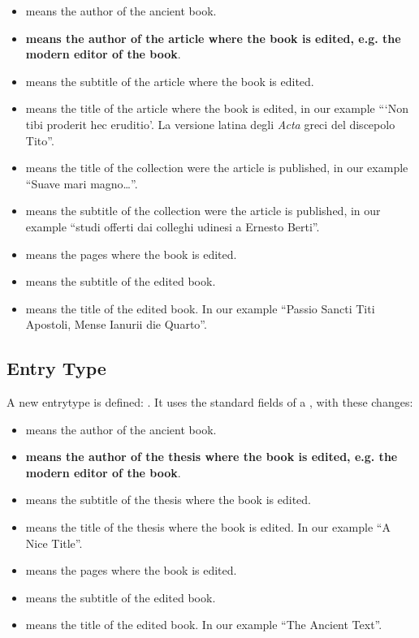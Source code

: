 \documentclass{ltxdockit}[2011/03/25]
\begin{document}
\begin{itemize}
	\item {} means the author of the ancient book.
	\item \textbf{ means the author of the article where the book is edited, e.g. the modern editor of the book}.
	\item {} means the subtitle of the article where the book is edited.
	\item {} means the title of the article where the book is edited, in our example \enquote{\enquote{Non tibi proderit hec eruditio}. La versione latina degli \emph{Acta} greci del discepolo Tito}. 
	\item {} means the title of the collection were the article is published, in our example \enquote{Suave mari magno\ldots}.
	\item {} means the subtitle of the collection were the article is published, in our example \enquote{studi offerti dai colleghi udinesi a Ernesto Berti}.
	\item {} means the pages where the book is edited.
	\item {} means the subtitle of the edited book.
	\item {} means the title of the edited book. In our example \enquote{Passio Sancti Titi Apostoli, Mense Ianurii die Quarto}.


\end{itemize}

\subsection{ Entry Type}

A new entrytype is defined: . It uses the standard fields of a , with these changes:

\begin{itemize}
	\item {} means the author of the ancient book.
	\item \textbf{ means the author of the thesis where the book is edited, e.g. the modern editor of the book}.
	\item {} means the subtitle of the thesis where the book is edited.
	\item {} means the title of the thesis where the book is edited. In our example \enquote{A Nice Title}.
	\item {} means the pages where the book is edited.
	\item {} means the subtitle of the edited book.
	\item {} means the title of the edited book. In our example \enquote{The Ancient Text}.


\end{itemize}
\end{document}
